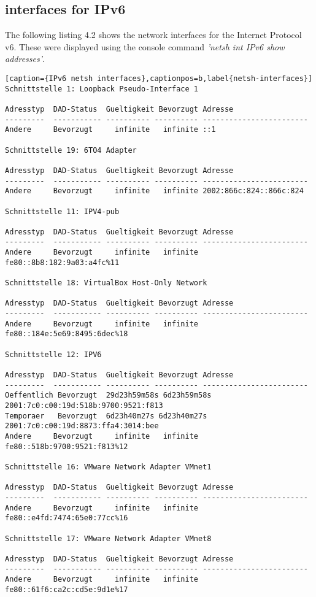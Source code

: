 \subsection{interfaces for IPv6}
The following listing 4.2 shows the network interfaces for the Internet Protocol v6. These were displayed using the console command \textit{'netsh int IPv6 show addresses'}.
\\
\begin{lstlisting}[caption={IPv6 netsh interfaces},captionpos=b,label{netsh-interfaces}]
Schnittstelle 1: Loopback Pseudo-Interface 1

Adresstyp  DAD-Status  Gueltigkeit Bevorzugt Adresse
---------  ----------- ---------- ---------- ------------------------
Andere     Bevorzugt     infinite   infinite ::1

Schnittstelle 19: 6TO4 Adapter

Adresstyp  DAD-Status  Gueltigkeit Bevorzugt Adresse
---------  ----------- ---------- ---------- ------------------------
Andere     Bevorzugt     infinite   infinite 2002:866c:824::866c:824

Schnittstelle 11: IPV4-pub

Adresstyp  DAD-Status  Gueltigkeit Bevorzugt Adresse
---------  ----------- ---------- ---------- ------------------------
Andere     Bevorzugt     infinite   infinite fe80::8b8:182:9a03:a4fc%11

Schnittstelle 18: VirtualBox Host-Only Network

Adresstyp  DAD-Status  Gueltigkeit Bevorzugt Adresse
---------  ----------- ---------- ---------- ------------------------
Andere     Bevorzugt     infinite   infinite fe80::184e:5e69:8495:6dec%18

Schnittstelle 12: IPV6

Adresstyp  DAD-Status  Gueltigkeit Bevorzugt Adresse
---------  ----------- ---------- ---------- ------------------------
Oeffentlich Bevorzugt  29d23h59m58s 6d23h59m58s 2001:7c0:c00:19d:518b:9700:9521:f813
Temporaer   Bevorzugt  6d23h40m27s 6d23h40m27s 2001:7c0:c00:19d:8873:ffa4:3014:bee
Andere     Bevorzugt     infinite   infinite fe80::518b:9700:9521:f813%12

Schnittstelle 16: VMware Network Adapter VMnet1

Adresstyp  DAD-Status  Gueltigkeit Bevorzugt Adresse
---------  ----------- ---------- ---------- ------------------------
Andere     Bevorzugt     infinite   infinite fe80::e4fd:7474:65e0:77cc%16

Schnittstelle 17: VMware Network Adapter VMnet8

Adresstyp  DAD-Status  Gueltigkeit Bevorzugt Adresse
---------  ----------- ---------- ---------- ------------------------
Andere     Bevorzugt     infinite   infinite fe80::61f6:ca2c:cd5e:9d1e%17
\end{lstlisting}


